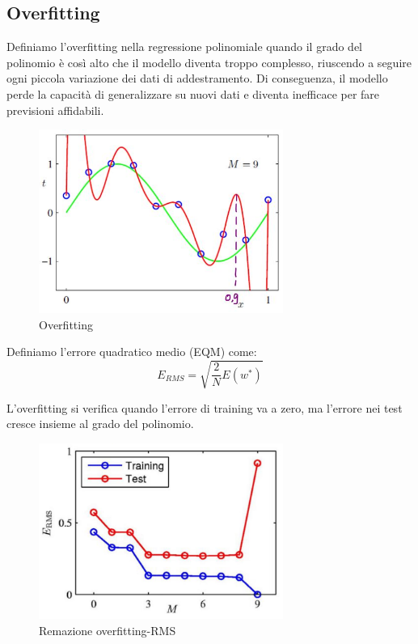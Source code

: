 \documentclass[
	a4paper,
	11pt,
	oneside
]{book}
\theoremstyle{std}
\begin{document}
	\subsection{Overfitting}
	\begin{definition}[Overfitting]
		Definiamo l'overfitting nella regressione polinomiale quando il grado del polinomio è così alto che il modello diventa troppo complesso, riuscendo a seguire ogni piccola variazione dei dati di addestramento. Di conseguenza, il modello perde la capacità di generalizzare su nuovi dati e diventa inefficace per fare previsioni affidabili.
	\end{definition}
	\begin{figure}[H]
		\centering
		\includegraphics[width = 8cm]{overfitting.jpg}
		\caption{Overfitting}
	\end{figure}
	\begin{definition}
		Definiamo l'errore quadratico medio (EQM) come:
		$$
			E_{RMS} = \sqrt{\frac{2}{N} E(w^*)}
		$$
	\end{definition}
	L'overfitting si verifica quando l'errore di training va a zero, ma l'errore nei test cresce insieme al grado del polinomio.
	\begin{figure}[H]
		\centering
		\includegraphics[width = 8cm]{overfitting_rms.png}
		\caption{Remazione overfitting-RMS}
	\end{figure}
\end{document}
